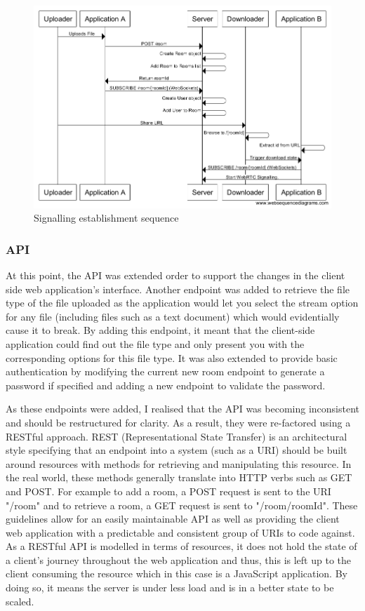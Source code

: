 \documentclass[]{report}
\begin{document}
				\begin{figure}[H]
					\caption{Signalling establishment sequence}
					\centering
					\includegraphics[scale=0.5]{signalling-establishment-sequence.png}
				\end{figure}
				
				\subsubsection*{API}
				At this point, the API was extended order to support the changes in the client side web application's interface. Another endpoint was added to retrieve the file type of the file uploaded as the application would let you select the stream option for any file (including files such as a text document) which would evidentially cause it to break. By adding this endpoint, it meant that the client-side application could find out the file type and only present you with the corresponding options for this file type. It was also extended to provide basic authentication by modifying the current new room endpoint to generate a password if specified and adding a new endpoint to validate the password. 
				
				As these endpoints were added, I realised that the API was becoming inconsistent and should be restructured for clarity. As a result, they were re-factored using a RESTful approach. REST (Representational State Transfer) is an architectural style specifying that an endpoint into a system (such as a URI) should be built around resources with methods for retrieving and manipulating this resource. In the real world, these methods generally translate into HTTP verbs such as GET and POST. For example to add a room, a POST request is sent to the URI "/room" and to retrieve a room, a GET request is sent to "/room/{roomId}". These guidelines allow for an easily maintainable API as well as providing the client web application with a predictable and consistent group of URIs to code against. As a RESTful API is modelled in terms of resources, it does not hold the state of a client's journey throughout the web application and thus, this is left up to the client consuming the resource which in this case is a JavaScript application. By doing so, it means the server is under less load and is in a better state to be scaled.
				
\end{document}
